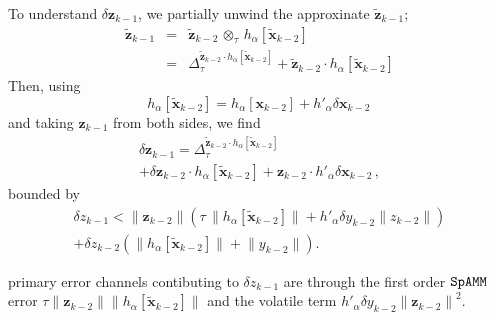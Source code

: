 \documentclass[letterpaper,twocolumn,amsmath,amsfont,amssymb,english,aps,jcp,preprintnumbers,groupaddress,nofootinbib,tightenlines]{revtex4}
\newcommand{\mat}[1]{\boldsymbol{#1}}
\newcommand{\ot}{ {\scriptstyle \otimes}_{ \tau } }
\begin{document}
To understand $\delta \mat{z}_{k-1}$, we partially unwind the approxinate  $\widetilde{\mat{z}}_{k-1}$;
\begin{eqnarray} \label{widetildez}
 \widetilde{\mat{z}}_{k-1} &=&  \widetilde{\mat{z}}_{k-2}  \, \ot \, h_\alpha[\widetilde{\mat{x}}_{k-2}]\\
&=& \Delta^{\widetilde{\mat{z}}_{k-2} \cdot h_\alpha \left[ \widetilde{\mat{x}}_{k-2}\right]}_\tau
+ \widetilde{\mat{z}}_{k-2} \cdot h_\alpha\left[ \widetilde{\mat{x}}_{k-2}\right]
\end{eqnarray}
Then, using
\begin{equation}
  h_\alpha \left[ \widetilde{\mat{x}}_{k-2} \right]
=  h_\alpha \left[ \mat{x}_{k-2} \right] +  h'_\alpha  \delta \mat{x}_{k-2} \, 
\end{equation}
and taking $\mat{z}_{k-1}$ from both sides, we find  
\begin{multline}
 \delta {\mat{z}}_{k-1} =\Delta^{\widetilde{\mat{z}}_{k-2} \cdot h_\alpha \left[ \widetilde{\mat{x}}_{k-2}\right]}_\tau
\\ +\delta \mat{z}_{k-2} \cdot h_\alpha \left[\widetilde{\mat{x}}_{k-2} \right]
+ \mat{z}_{k-2} \cdot h'_\alpha \delta \mat{x}_{k-2}  \, ,
\end{multline}
bounded by 
 \begin{multline}
  \delta {z}_{k-1} <
 \lVert \mat{z}_{k-2} \rVert \left( \tau \, \lVert h_\alpha \left[\widetilde{\mat{x}}_{k-2} \right]  \rVert
 + h'_\alpha  \delta y_{k-2} \lVert z_{k-2} \rVert \right)  \\ 
 + \delta {z}_{k-2} \left( \lVert h_\alpha \left[\widetilde{\mat{x}}_{k-2}  \right] \rVert  + \lVert y_{k-2} \rVert \right) .
 \end{multline}


primary error channels contibuting to $\delta z_{k-1}$ are through the first order $\tt SpAMM$ error
$ \tau \lVert \mat{z}_{k-2} \rVert \lVert h_\alpha \left[\widetilde{\mat{x}}_{k-2} \right]\rVert$
and the volatile term $h'_\alpha  \delta y_{k-2} { \lVert \mat{z}_{k-2} \rVert }^2$.
\end{document}
